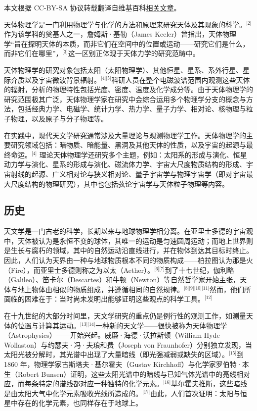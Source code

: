 
本文根据 CC-BY-SA 协议转载翻译自维基百科\href{https://en.wikipedia.org/wiki/Astrophysics?utm_source=chatgpt.com}{相关文章}。


天体物理学是一门利用物理学与化学的方法和原理来研究天体及其现象的科学。\(^\text{[2]}\)作为该学科的奠基人之一，詹姆斯·基勒（James Keeler）曾指出，天体物理学“旨在探明天体的本质，而非它们在空间中的位置或运动——研究它们是什么，而非它们在哪里”，\(^\text{[3]}\)这一区别正体现于天体力学的研究范畴中。

天体物理学的研究对象包括太阳（太阳物理学）、其他恒星、星系、系外行星、星际介质以及宇宙微波背景辐射。\(^\text{[4][5]}\)科研人员在整个电磁波谱范围内观测这些天体的辐射，分析的物理特性包括光度、密度、温度及化学成分等。由于天体物理学的研究范围极其广泛，天体物理学家在研究中会综合运用多个物理学分支的概念与方法，包括经典力学、电磁学、统计力学、热力学、量子力学、相对论、核物理与粒子物理，以及原子与分子物理等。

在实践中，现代天文学研究通常涉及大量理论与观测物理学工作。天体物理学的主要研究领域包括：暗物质、暗能量、黑洞及其他天体的性质，以及宇宙的起源与最终命运。\(^\text{[4]}\)
理论天体物理学还研究多个主题，例如：太阳系的形成与演化、恒星动力学与演化、星系的形成与演化、磁流体力学、宇宙大尺度物质结构的形成、宇宙射线的起源、广义相对论与狭义相对论、量子宇宙学与物理宇宙学（即对宇宙最大尺度结构的物理研究），其中也包括弦论宇宙学与天体粒子物理等内容。
\subsection{历史}
天文学是一门古老的科学，长期以来与地球物理学相分离。在亚里士多德的宇宙观中，天体被认为是永恒不变的球体，其唯一的运动是匀速圆周运动；而地上世界则是生长与腐朽的领域，其中的自然运动沿直线进行，并在物体到达其目标时终止。因此，人们认为天界由一种与地球物质根本不同的物质构成——柏拉图认为那是火（Fire），而亚里士多德则称之为以太（Aether）。\(^\text{[6][7]}\)到了十七世纪，伽利略（Galileo）、笛卡尔（Descartes）和牛顿（Newton）等自然哲学家开始主张，天体与地上物体由相似的物质组成，并遵循相同的自然规律。\(^\text{[8][9][10][11]}\)然而，他们所面临的困难在于：当时尚未发明出能够证明这些观点的科学工具。\(^\text{[12]}\)

在十九世纪的大部分时间里，天文学研究的重点仍是例行性的观测工作，如测量天体的位置与计算其运动。\(^\text{[13][14]}\)一种新的天文学——很快被称为天体物理学（Astrophysics）——开始兴起。威廉·海德·沃拉斯顿（William Hyde Wollaston）与约瑟夫·冯·夫琅和费（Joseph von Fraunhofer）分别独立发现，当太阳光被分解时，其光谱中出现了大量暗线（即光强减弱或缺失的区域）。\(^\text{[15]}\)到 1860 年，物理学家古斯塔夫·基尔霍夫（Gustav Kirchhoff）与化学家罗伯特·本生（Robert Bunsen）证明，这些太阳光谱中的暗线与已知气体光谱中的亮线相对应，而每条特定的谱线都对应一种独特的化学元素。\(^\text{[16]}\)基尔霍夫推断，这些暗线是由太阳大气中化学元素吸收光线所造成的。\(^\text{[17]}\)由此，人们首次证明：太阳与恒星中存在的化学元素，也同样存在于地球上。

